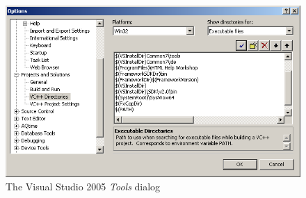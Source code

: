 \documentclass[a4paper,titlepage]{report}
\begin{document}
\begin{figure}[h]
    \centering
    \caption{The Visual Studio 2005 \emph{Tools} dialog\label{fig:VisualStudioToolsDialog}}
    \includegraphics[width=\textwidth]{./VS2005_ExeDirs.png}
\end{figure}

\pagebreak{}\tableofcontents\thispagestyle{fancy}
\end{document}
